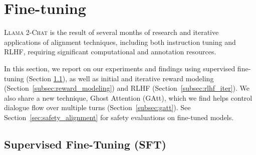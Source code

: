 \documentclass{article}
\newcommand{\modelname}{\textsc{Llama 2-Chat}\xspace}
\begin{document}
\section{Fine-tuning}
\label{sec:fine_tuning}

\modelname is the result of several months of research and iterative applications of alignment techniques, including both instruction tuning and RLHF, requiring significant computational and annotation resources.

In this section, we report on our experiments and findings using supervised fine-tuning (Section \ref{subsec:SFT}), as well as initial and iterative reward modeling (Section~\ref{subsec:reward_modeling}) and RLHF (Section~\ref{subsec:rlhf_iter}). We also share a new technique, Ghost Attention (GAtt), which we find helps control dialogue flow over multiple turns (Section~\ref{subsec:gatt}). See Section~\ref{sec:safety_alignment} for safety evaluations on fine-tuned models.

\subsection{Supervised Fine-Tuning (SFT)} 
\label{subsec:SFT}
\end{document}
